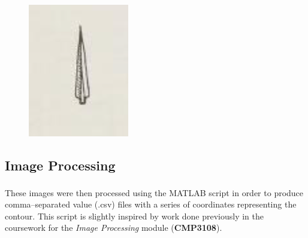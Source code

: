 \documentclass[12pt,english]{article}
\begin{document}
\begin{figure}[!hbt]
\begin{centre}
\begin{minipage}{0.19\textwidth}
		\includegraphics[width=\textwidth]{../code/contour/original/subulate}
	\end{minipage}
\end{centre}
\end{figure}
\pagebreak

\subsection{Image Processing}
These images were then processed using the MATLAB\textsuperscript{\textregistered} script \textbf{}
in order to produce comma--separated value (.csv) files with a series
of coordinates representing the contour.
This script is slightly inspired by work done previously in
the coursework for the \textit{Image Processing} module (\textbf{CMP3108}).
\end{document}
